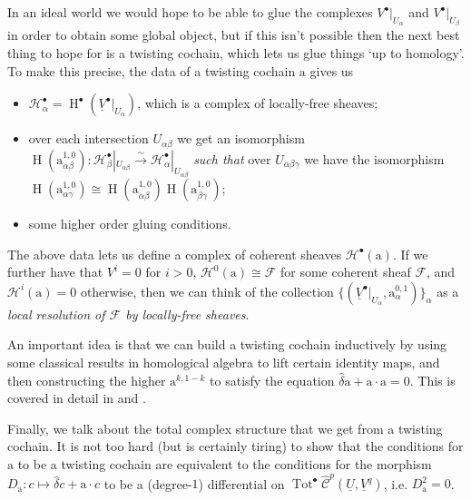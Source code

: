 \documentclass[11pt,notitlepage]{article}
\numberwithin{equation}{subsection}
\DeclareMathOperator{\Tot}{Tot}
\newcommand{\congto}{\xrightarrow{\sim}}
\renewcommand{\H}{\operatorname{H}}
\renewcommand{\C}{\mathscr{C}}
\begin{document}
                In an ideal world we would hope to be able to glue the complexes $V^\bullet|_{U_\alpha}$ and $V^\bullet|_{U_\beta}$ in order to obtain some global object, but if this isn't possible then the next best thing to hope for is a twisting cochain, which lets us glue things `up to homology'.
                To make this precise, the data of a twisting cochain $\mathrm{a}$ gives us
                \begin{itemize}
                    \item $\mathcal{H}^\bullet_\alpha=\H^\bullet(\underline{V}^\bullet|_{U_\alpha})$, which is a complex of locally-free sheaves;
                    \item over each intersection $U_{\alpha\beta}$ we get an isomorphism $\H(\mathrm{a}^{1,0}_{\alpha\beta})\colon\mathcal{H}^\bullet_\beta|_{U_{\alpha\beta}}\congto\mathcal{H}^\bullet_\alpha|_{U_{\alpha\beta}}$ \textit{such that} over $U_{\alpha\beta\gamma}$ we have the isomorphism $\H(\mathrm{a}^{1,0}_{\alpha\gamma})\cong\H(\mathrm{a}^{1,0}_{\alpha\beta})\H(\mathrm{a}^{1,0}_{\beta\gamma})$;
                    \item some higher order gluing conditions.
                \end{itemize}

                The above data lets us define a complex of coherent sheaves $\mathcal{H}^\bullet(\mathrm{a})$.
                If we further have that $V^i=0$ for $i>0$, $\mathcal{H}^0(\mathrm{a})\cong\mathcal{F}$ for some coherent sheaf $\mathcal{F}$, and $\mathcal{H}^i(\mathrm{a})=0$ otherwise, then we can think of the collection $\{(\underline{V}^\bullet|_{U_\alpha},\mathrm{a}^{0,1}_\alpha)\}_{\alpha}$ as a \textit{local resolution of $\mathcal{F}$ by locally-free sheaves}.

                \begin{note}
                    An important idea is that we can build a twisting cochain inductively by using some classical results in homological algebra to lift certain identity maps, and then constructing the higher $\mathrm{a}^{k,1-k}$ to satisfy the equation $\hat{\delta}\mathrm{a}+\mathrm{a}\cdot\mathrm{a}=0$.
                    This is covered in detail in \cite[p.~230]{OBrian:1981vs} and \cite[Lemma~8.13]{Toledo:1976gy}.
                \end{note}

                \bigskip

                Finally, we talk about the total complex structure that we get from a twisting cochain.
                It is not too hard (but is certainly tiring) to show that the conditions for $\mathrm{a}$ to be a twisting cochain are equivalent to the conditions for the morphism $D_\mathrm{a}\colon c\mapsto\hat{\delta}c+\mathrm{a}\cdot c$ to be a (degree-$1$) differential on $\Tot^\bullet\hat{\C}^p(\underline{U},\underline{V}^q)$, i.e. $D_\mathrm{a}^2=0$.
\end{document}
